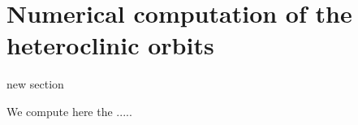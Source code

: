 \documentclass[a4paper,11pt]{article}
\def\red{\color{red}}
\theoremstyle{remark}
\begin{document}
%
%
%


\vfil\eject
\section{Numerical computation of the heteroclinic orbits}
{\red new section}

We compute here the .....





\vfil\eject
\end{document}
